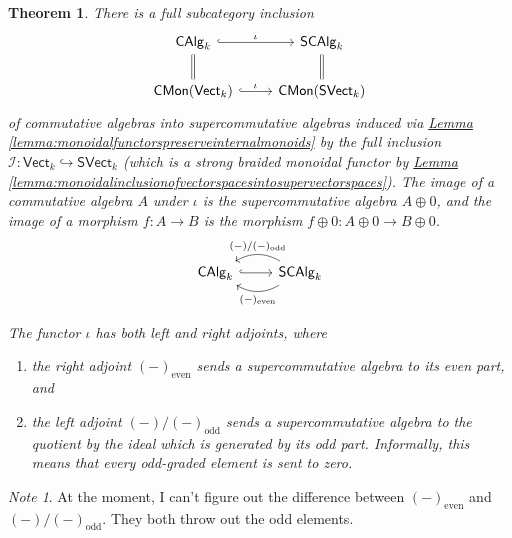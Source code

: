 \documentclass[a4paper,10pt]{scrreprt}
\theoremstyle{definition}
\theoremstyle{plain}
\newtheorem{theorem}{Theorem}[section]
\theoremstyle{remark}
\newtheorem{note}{Note}[section]
\begin{document}
\begin{theorem}
  There is a full subcategory inclusion
  \begin{equation*}
    \begin{tikzcd}
      \mathsf{CAlg}_{k}
      \arrow[d, equals]
      \arrow[r, "\iota", hookrightarrow]
      & \mathsf{SCAlg}_{k}
      \arrow[d, equals]
      \\
      \mathsf{CMon}(\mathsf{Vect}_{k}) 
      \arrow[r, "\iota", hookrightarrow]
      & \mathsf{CMon}(\mathsf{SVect}_{k})
    \end{tikzcd}
  \end{equation*}
  of commutative algebras into supercommutative algebras induced via \hyperref[lemma:monoidalfunctorspreserveinternalmonoids]{Lemma \ref*{lemma:monoidalfunctorspreserveinternalmonoids}} by the full inclusion $\mathcal{I}\colon \mathsf{Vect}_{k} \hookrightarrow \mathsf{SVect}_{k}$ (which is a strong braided monoidal functor by \hyperref[lemma:monoidalinclusionofvectorspacesintosupervectorspaces]{Lemma \ref*{lemma:monoidalinclusionofvectorspacesintosupervectorspaces}}). The image of a commutative algebra $A$ under $\iota$ is the supercommutative algebra $A \oplus 0$, and the image of a morphism $f\colon A \to B$ is the morphism $f \oplus 0\colon A \oplus 0 \to B \oplus 0$.
  \begin{equation*}
    \begin{tikzcd}
      \mathsf{CAlg}_{k}
      \arrow[r, hookrightarrow]
      & \mathsf{SCAlg}_{k}
      \arrow[l, bend left, "(-)_{\text{even}}"]
      \arrow[l, bend right, swap, "(-)/(-)_{\text{odd}}"]
    \end{tikzcd}
  \end{equation*}

  The functor $\iota$ has both left and right adjoints, where
  \begin{enumerate}
    \item the right adjoint $(-)_{\text{even}}$ sends a supercommutative algebra to its even part, and
    \item the left adjoint $(-)/(-)_{\text{odd}}$ sends a supercommutative algebra to the quotient by the ideal which is generated by its odd part. Informally, this means that every odd-graded element is sent to zero.
  \end{enumerate}
\end{theorem}
\begin{note}
  At the moment, I can't figure out the difference between $(-)_{\text{even}}$ and $(-)/(-)_{\text{odd}}$. They both throw out the odd elements.
\end{note}
\end{document}
